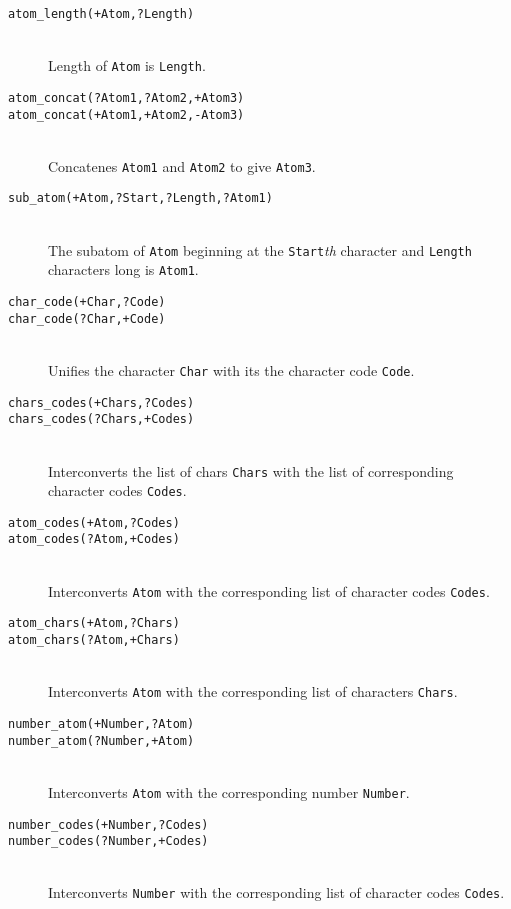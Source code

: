 \begin{description}

\item [{\tt atom\_length(+Atom,?Length)}]~\\
	Length of {\tt Atom} is {\tt Length}.

\item [{\tt atom\_concat(?Atom1,?Atom2,+Atom3)}]
\item [{\tt atom\_concat(+Atom1,+Atom2,-Atom3)}]~\\
	Concatenes {\tt Atom1} and {\tt Atom2} to give {\tt Atom3}.

\item [{\tt sub\_atom(+Atom,?Start,?Length,?Atom1)}]~\\
	The subatom of {\tt Atom} beginning at the {\tt Start}{\em th}
	character and {\tt Length} characters long is {\tt Atom1}.

\item [{\tt char\_code(+Char,?Code)}]
\item [{\tt char\_code(?Char,+Code)}]~\\
	Unifies the character {\tt Char} with its the character code 
	{\tt Code}.

\item [{\tt chars\_codes(+Chars,?Codes)}]
\item [{\tt chars\_codes(?Chars,+Codes)}]~\\
	Interconverts the list of chars {\tt Chars} with the list of
	corresponding character codes {\tt Codes}.

\item [{\tt atom\_codes(+Atom,?Codes)}]
\item [{\tt atom\_codes(?Atom,+Codes)}]~\\
	Interconverts {\tt Atom} with the corresponding list of
	character codes {\tt Codes}.

\item [{\tt atom\_chars(+Atom,?Chars)}]
\item [{\tt atom\_chars(?Atom,+Chars)}]~\\
	Interconverts {\tt Atom} with the corresponding list of
	characters {\tt Chars}.

\item [{\tt number\_atom(+Number,?Atom)}]
\item [{\tt number\_atom(?Number,+Atom)}]~\\
	Interconverts {\tt Atom} with the corresponding number {\tt Number}.

\item [{\tt number\_codes(+Number,?Codes)}]
\item [{\tt number\_codes(?Number,+Codes)}]~\\
	Interconverts {\tt Number} with the corresponding list of
	character codes {\tt Codes}.


\end{description}
